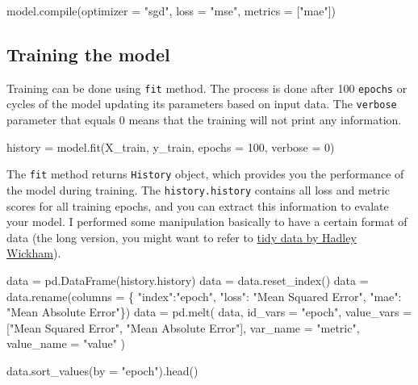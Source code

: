 \documentclass[
  letterpaper,
  DIV=11,
  numbers=noendperiod]{scrreprt}
\newenvironment{Shaded}{\begin{snugshade}}{\end{snugshade}}
\newcommand{\BuiltInTok}[1]{\textcolor[rgb]{0.00,0.23,0.31}{#1}}
\newcommand{\DecValTok}[1]{\textcolor[rgb]{0.68,0.00,0.00}{#1}}
\newcommand{\NormalTok}[1]{\textcolor[rgb]{0.00,0.23,0.31}{#1}}
\newcommand{\OperatorTok}[1]{\textcolor[rgb]{0.37,0.37,0.37}{#1}}
\newcommand{\StringTok}[1]{\textcolor[rgb]{0.13,0.47,0.30}{#1}}
\begin{document}
\begin{Shaded}
\begin{Highlighting}[]
\NormalTok{model.}\BuiltInTok{compile}\NormalTok{(optimizer }\OperatorTok{=} \StringTok{"sgd"}\NormalTok{, loss }\OperatorTok{=} \StringTok{"mse"}\NormalTok{, metrics }\OperatorTok{=}\NormalTok{ [}\StringTok{"mae"}\NormalTok{])}
\end{Highlighting}
\end{Shaded}

\hypertarget{training-the-model}{%
\subsection{Training the model}\label{training-the-model}}

Training can be done using \texttt{fit} method. The process is done
after 100 \texttt{epochs} or cycles of the model updating its parameters
based on input data. The \texttt{verbose} parameter that equals 0 means
that the training will not print any information.

\begin{Shaded}
\begin{Highlighting}[]
\NormalTok{history }\OperatorTok{=}\NormalTok{ model.fit(X\_train, y\_train, epochs }\OperatorTok{=} \DecValTok{100}\NormalTok{, verbose }\OperatorTok{=} \DecValTok{0}\NormalTok{)}
\end{Highlighting}
\end{Shaded}

The \texttt{fit} method returns \texttt{History} object, which provides
you the performance of the model during training. The
\texttt{history.history} contains all loss and metric scores for all
training epochs, and you can extract this information to evalate your
model. I performed some manipulation basically to have a certain format
of data (the long version, you might want to refer to \href{}{tidy data
by Hadley Wickham}).

\begin{Shaded}
\begin{Highlighting}[]
\NormalTok{data }\OperatorTok{=}\NormalTok{ pd.DataFrame(history.history)}
\NormalTok{data }\OperatorTok{=}\NormalTok{ data.reset\_index()}
\NormalTok{data }\OperatorTok{=}\NormalTok{ data.rename(columns }\OperatorTok{=}\NormalTok{ \{}
    \StringTok{"index"}\NormalTok{:}\StringTok{"epoch"}\NormalTok{, }
    \StringTok{"loss"}\NormalTok{: }\StringTok{"Mean Squared Error"}\NormalTok{, }
    \StringTok{"mae"}\NormalTok{: }\StringTok{"Mean Absolute Error"}\NormalTok{\})}
\NormalTok{data }\OperatorTok{=}\NormalTok{ pd.melt(}
\NormalTok{    data, }
\NormalTok{    id\_vars }\OperatorTok{=} \StringTok{"epoch"}\NormalTok{, }
\NormalTok{    value\_vars }\OperatorTok{=}\NormalTok{ [}\StringTok{"Mean Squared Error"}\NormalTok{, }\StringTok{"Mean Absolute Error"}\NormalTok{],}
\NormalTok{    var\_name }\OperatorTok{=} \StringTok{"metric"}\NormalTok{,}
\NormalTok{    value\_name }\OperatorTok{=} \StringTok{"value"}
\NormalTok{)}

\NormalTok{data.sort\_values(by }\OperatorTok{=} \StringTok{"epoch"}\NormalTok{).head()}
\end{Highlighting}
\end{Shaded}
\end{document}
